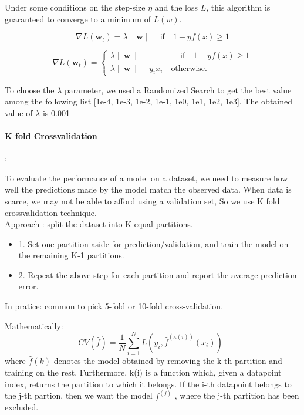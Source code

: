 \documentclass[11pt]{article}
\begin{document}
Under some conditions on the step-size $\eta$ and the loss $L$, this algorithm is guaranteed to converge to a minimum of $L(w)$.

$$\nabla L (\mathbf{w}_t)=\lambda \| \mathbf{w}\| \quad \text{if} \quad 1-yf(x)\geq 1$$
$$$$

$$\nabla L (\mathbf{w}_t)
=
\begin{cases}
\lambda \| \mathbf{w}\| \quad \quad \quad \quad\quad \text{if}\quad 1-yf(x) \geq 1 \\ \lambda \| \mathbf{w}\|-y_ix_i \quad\text{otherwise.}
\end{cases}
$$

To choose the $\lambda $ parameter, we used a Randomized Search to get the best value among the following list [1e-4, 1e-3, 1e-2, 1e-1, 1e0, 1e1, 1e2, 1e3]. The obtained value of $\lambda $ is 0.001

\paragraph{K fold Crossvalidation}: 

To evaluate the performance of a model on a dataset, we need to measure how well the predictions made by the model match the observed data. 
When data is scarce, we may not be able to afford using a validation set, So we use K fold crossvalidation technique.\\
Approach : split the dataset into K equal partitions.
\begin{itemize}
    \item 1. Set one partition aside for prediction/validation, and train the model on the remaining K-1 partitions.\\
   \item 2. Repeat the above step for each partition and report the average prediction error.

\end{itemize}

In pratice: common to pick 5-fold or 10-fold cross-validation.

Mathematically: 
$$
        CV({\hat{f}}) = \frac{1}{N} \sum_{i=1}^{N} L(y_{i}, {\hat{f}}^{(\kappa(i))}(x_{i})) \enspace $$
where $\hat{f}(k)$ denotes the model obtained by removing the k-th partition and training on the
rest. Furthermore, k(i) is a function which, given a datapoint index, returns the partition to
which it belongs. If the i-th datapoint belongs to the j-th partion, then we want the model
$f^{(j)}$
, where the j-th partition has been excluded.
\end{document}
